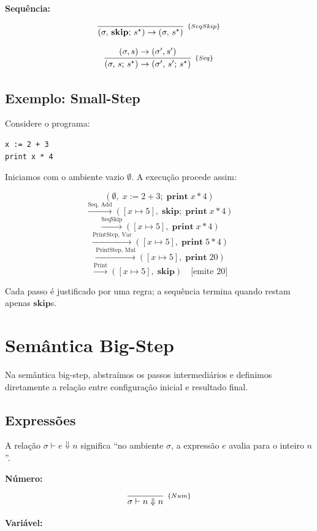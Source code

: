 \textbf{Sequência:}

\[
  \infer[_{\{SeqSkip\}}]{(\sigma,\, \mathbf{skip};\, s^\star) \to
  (\sigma,\, s^\star)}{}
\]

\[
  \infer[_{\{Seq\}}]{(\sigma,\, s;\, s^\star) \to (\sigma',\, s';\,
  s^\star)}{(\sigma, s) \to (\sigma', s')}
\]

\subsection{Exemplo: Small-Step}

Considere o programa:

\begin{verbatim}
x := 2 + 3
print x * 4
\end{verbatim}

Iniciamos com o ambiente vazio \(\emptyset\). A execução procede assim:

\[
  (\emptyset,\; x \mathbin{:=} 2 + 3;\; \mathbf{print}\; x * 4)
\] \[
  \xrightarrow{\text{Seq, Add}} ([x \mapsto 5],\; \mathbf{skip};\;
  \mathbf{print}\; x * 4)
\] \[
  \xrightarrow{\text{SeqSkip}} ([x \mapsto 5],\; \mathbf{print}\; x * 4)
\] \[
  \xrightarrow{\text{PrintStep, Var}} ([x \mapsto 5],\; \mathbf{print}\; 5 * 4)
\] \[
  \xrightarrow{\text{PrintStep, Mul}} ([x \mapsto 5],\; \mathbf{print}\; 20)
\] \[
  \xrightarrow{\text{Print}} ([x \mapsto 5],\; \mathbf{skip}) \quad
  \text{[emite 20]}
\]

Cada passo é justificado por uma regra; a sequência termina quando
restam apenas \(\mathbf{skip}\)s.

\section{Semântica Big-Step}

Na semântica big-step, abstraímos os passos intermediários e
definimos diretamente a relação entre configuração inicial e resultado final.

\subsection{Expressões}

A relação \(\sigma \vdash e \Downarrow n\) significa ``no ambiente
\(\sigma\), a expressão \(e\) avalia para o inteiro \(n\)''.

\textbf{Número:}

\[
  \infer[_{\{Num\}}]{\sigma \vdash n \Downarrow n}{}
\]

\textbf{Variável:}


